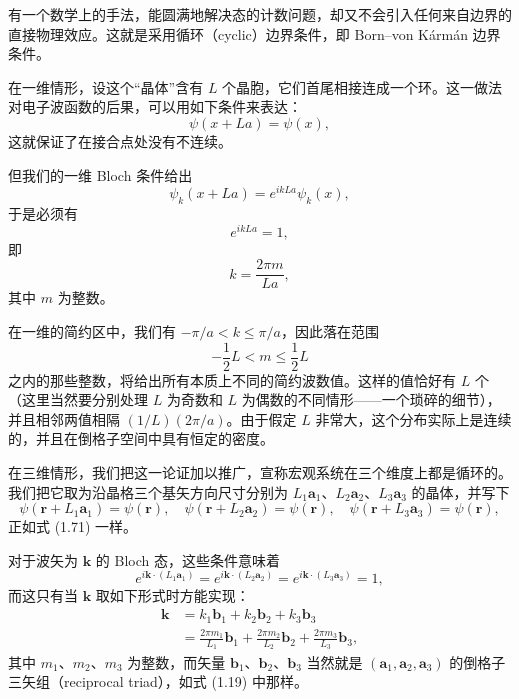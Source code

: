 有一个数学上的手法，能圆满地解决态的计数问题，却又不会引入任何来自边界的直接物理效应。这就是采用循环（cyclic）边界条件，即 Born–von Kármán 边界条件。

在一维情形，设这个“晶体”含有 $L$ 个晶胞，它们首尾相接连成一个环。这一做法对电子波函数的后果，可以用如下条件来表达：
\begin{equation*}
\psi(x+La)=\psi(x),
\tag{1.71}
\end{equation*}
这就保证了在接合点处没有不连续。

但我们的一维 Bloch 条件给出
\begin{equation*}
\psi_k(x+La)=e^{ikLa}\psi_k(x),
\tag{1.72}
\end{equation*}
于是必须有
\begin{equation*}
e^{ikLa}=1,
\tag{1.73}
\end{equation*}
即
\begin{equation*}
k=\frac{2\pi m}{La},
\tag{1.74}
\end{equation*}
其中 $m$ 为整数。

在一维的简约区中，我们有 $-\pi/a<k\leqslant\pi/a$，因此落在范围
\begin{equation*}
-\frac{1}{2}L<m\leqslant\frac{1}{2}L
\tag{1.75}
\end{equation*}
之内的那些整数，将给出所有本质上不同的简约波数值。这样的值恰好有 $L$ 个（这里当然要分别处理 $L$ 为奇数和 $L$ 为偶数的不同情形——一个琐碎的细节），并且相邻两值相隔 $(1/L)(2\pi/a)$。由于假定 $L$ 非常大，这个分布实际上是连续的，并且在倒格子空间中具有恒定的密度。

在三维情形，我们把这一论证加以推广，宣称宏观系统在三个维度上都是循环的。我们把它取为沿晶格三个基矢方向尺寸分别为 $L_1\mathbf{a}_1$、$L_2\mathbf{a}_2$、$L_3\mathbf{a}_3$ 的晶体，并写下
\begin{equation*}
\psi(\mathbf{r}+L_1\mathbf{a}_1)=\psi(\mathbf{r}),\quad
\psi(\mathbf{r}+L_2\mathbf{a}_2)=\psi(\mathbf{r}),\quad
\psi(\mathbf{r}+L_3\mathbf{a}_3)=\psi(\mathbf{r}),
\tag{1.76}
\end{equation*}
正如式 (1.71) 一样。

对于波矢为 $\mathbf{k}$ 的 Bloch 态，这些条件意味着
\begin{equation*}
e^{i\mathbf{k}\cdot(L_1\mathbf{a}_1)}
=e^{i\mathbf{k}\cdot(L_2\mathbf{a}_2)}
=e^{i\mathbf{k}\cdot(L_3\mathbf{a}_3)}=1,
\tag{1.77}
\end{equation*}
而这只有当 $\mathbf{k}$ 取如下形式时方能实现：
\begin{align*}
\mathbf{k} &= k_1\mathbf{b}_1+k_2\mathbf{b}_2+k_3\mathbf{b}_3\\
&= \frac{2\pi m_1}{L_1}\mathbf{b}_1+\frac{2\pi m_2}{L_2}\mathbf{b}_2+\frac{2\pi m_3}{L_3}\mathbf{b}_3,
\tag{1.78}
\end{align*}
其中 $m_1$、$m_2$、$m_3$ 为整数，而矢量 $\mathbf{b}_1$、$\mathbf{b}_2$、$\mathbf{b}_3$ 当然就是 $(\mathbf{a}_1,\mathbf{a}_2,\mathbf{a}_3)$ 的倒格子三矢组（reciprocal triad），如式 (1.19) 中那样。

